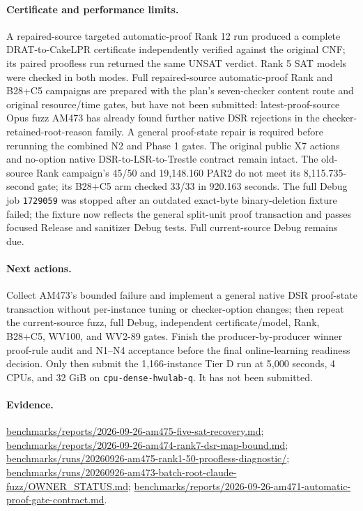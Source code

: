 \documentclass[11pt]{article}
\begin{document}
\paragraph{Certificate and performance limits.}
A repaired-source targeted automatic-proof Rank 12 run produced a complete
DRAT-to-CakeLPR certificate independently verified against the original CNF;
its paired proofless run returned the same UNSAT verdict. Rank 5 SAT models
were checked in both modes. Full repaired-source automatic-proof Rank and
B28+C5 campaigns are prepared with the plan's seven-checker content route
and original resource/time gates, but have not been submitted: latest-proof-source
Opus fuzz AM473 has already found further native DSR rejections in the
checker-retained-root-reason family. A general proof-state repair is required
before rerunning the combined N2 and Phase 1 gates. The original public X7
actions and no-option native DSR-to-LSR-to-Trestle contract remain intact.
The old-source Rank campaign's 45/50 and 19,148.160 PAR2 do not meet its
8,115.735-second gate; its B28+C5 arm checked 33/33 in 920.163 seconds.
The full Debug job \texttt{1729059} was stopped after an outdated exact-byte
binary-deletion fixture failed; the fixture now reflects the general
split-unit proof transaction and passes focused Release and sanitizer Debug
tests. Full current-source Debug remains due.

\paragraph{Next actions.}
Collect AM473's bounded failure and implement a general native DSR
proof-state transaction without per-instance tuning or checker-option changes;
then repeat the current-source fuzz, full Debug, independent certificate/model,
Rank, B28+C5, WV100, and WV2-89 gates. Finish the producer-by-producer winner
proof-rule audit and N1--N4 acceptance before the final online-learning
readiness decision. Only then submit the 1,166-instance Tier D run at
5,000 seconds, 4 CPUs, and 32 GiB on \texttt{cpu-dense-hwulab-q}. It has not
been submitted.

\paragraph{Evidence.}
\url{benchmarks/reports/2026-09-26-am475-five-sat-recovery.md};
\url{benchmarks/reports/2026-09-26-am474-rank7-dsr-map-bound.md};
\url{benchmarks/runs/20260926-am475-rank1-50-proofless-diagnostic/};
\url{benchmarks/runs/20260926-am473-batch-root-claude-fuzz/OWNER_STATUS.md};
\url{benchmarks/reports/2026-09-26-am471-automatic-proof-gate-contract.md}.
\end{document}
